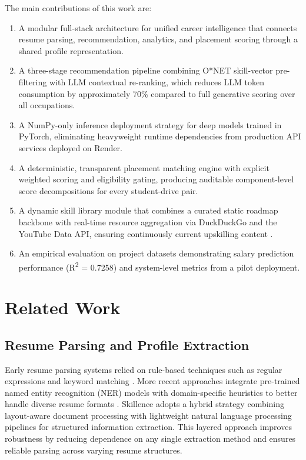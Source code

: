 \documentclass[conference]{IEEEtran}
\begin{document}
The main contributions of this work are:
\begin{enumerate}
\item A modular full-stack architecture for unified career intelligence
      that connects resume parsing, recommendation, analytics, and
      placement scoring through a shared profile representation.
\item A three-stage recommendation pipeline combining O*NET
      skill-vector pre-filtering with LLM contextual re-ranking, which
      reduces LLM token consumption by approximately 70\% compared to
      full generative scoring over all occupations.
\item A NumPy-only inference deployment strategy for deep models
      trained in PyTorch, eliminating heavyweight runtime dependencies
      from production API services deployed on Render.
\item A deterministic, transparent placement matching engine with
      explicit weighted scoring and eligibility gating, producing
      auditable component-level score decompositions for every
      student-drive pair.
\item A dynamic skill library module that combines a curated static
      roadmap backbone with real-time resource aggregation via
      DuckDuckGo and the YouTube Data API, ensuring continuously
      current upskilling content \cite{preethika2025,li2025}.
\item An empirical evaluation on project datasets demonstrating salary
      prediction performance (R\textsuperscript{2} = 0.7258) and
      system-level metrics from a pilot deployment.
\end{enumerate}

\section{Related Work}

\subsection{Resume Parsing and Profile Extraction}
Early resume parsing systems relied on rule-based techniques such as regular expressions and keyword matching \cite{resspar2024}. More recent approaches integrate pre-trained named entity recognition (NER) models with domain-specific heuristics to better handle diverse resume formats \cite{gaur2021}. Skillence adopts a hybrid strategy combining layout-aware document processing with lightweight natural language processing pipelines for structured information extraction. This layered approach improves robustness by reducing dependence on any single extraction method and ensures reliable parsing across varying resume structures.
\end{document}
